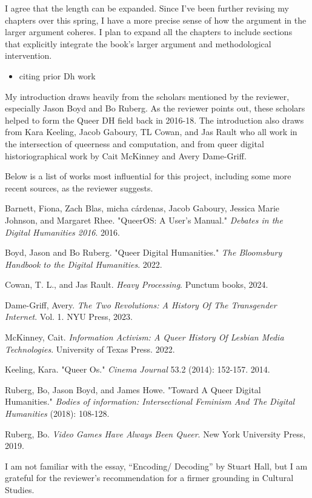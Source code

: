 \documentclass[11pt]{article}
\begin{document}
I agree that the length can be expanded. Since I've been further
revising my chapters over this spring, I have a more precise sense of
how the argument in the larger argument coheres. I plan to expand all
the chapters to include sections that explicitly integrate the book's
larger argument and methodological intervention.

\begin{itemize}
\item citing prior Dh work
\end{itemize}

My introduction draws heavily from the scholars mentioned by the
reviewer, especially Jason Boyd and Bo Ruberg. As the reviewer points
out, these scholars helped to form the Queer DH field back in 2016-18.
The introduction also draws from Kara Keeling, Jacob Gaboury, TL
Cowan, and Jas Rault who all work in the intersection of queerness and
computation, and from queer digital historiographical work by Cait
McKinney and Avery Dame-Griff.

Below is a list of works most influential for this project, including
some more recent sources, as the reviewer suggests.

Barnett, Fiona, Zach Blas, micha cárdenas, Jacob Gaboury, Jessica
Marie Johnson, and Margaret Rhee. "QueerOS: A User’s Manual."
\emph{Debates in the Digital Humanities 2016}. 2016.

Boyd, Jason and Bo Ruberg. "Queer Digital Humanities." \emph{The
Bloomsbury Handbook to the Digital Humanities}. 2022.

Cowan, T. L., and Jas Rault. \emph{Heavy Processing}. Punctum
books, 2024.

Dame-Griff, Avery. \emph{The Two Revolutions: A History Of The
Transgender Internet}. Vol. 1. NYU Press, 2023.

McKinney, Cait. \emph{Information Activism: A Queer History Of Lesbian
Media Technologies}. University of Texas Press. 2022.

Keeling, Kara. "Queer Os." \emph{Cinema Journal} 53.2 (2014):
152-157. 2014.

Ruberg, Bo, Jason Boyd, and James Howe. "Toward A Queer Digital
Humanities." \emph{Bodies of information: Intersectional Feminism And The
Digital Humanities} (2018): 108-128.

Ruberg, Bo. \emph{Video Games Have Always Been Queer}. New York
University Press, 2019.

I am not familiar with the essay, “Encoding/ Decoding” by Stuart Hall,
but I am grateful for the reviewer's recommendation for a firmer
grounding in Cultural Studies.
\end{document}
